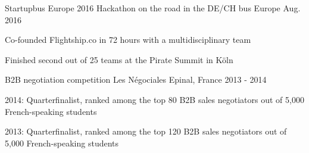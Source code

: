 

\begin{cventries}

  \cventry
    {Startupbus Europe 2016} %
    {Hackathon on the road in the DE/CH bus} %
    {Europe} %
    {Aug. 2016} %
    {
      \begin{cvitems} %
        \item {Co-founded Flightship.co in 72 hours with a multidisciplinary team}
        \item {Finished second out of 25 teams at the Pirate Summit in Köln}
      \end{cvitems}
    }

  \cventry
    {B2B negotiation competition} %
    {Les Négociales} %
    {Epinal, France} %
    {2013 - 2014} %
    {
    	\begin{cvitems}
    	\item{2014: Quarterfinalist, ranked among the top 80 B2B sales negotiators out of 5,000 French-speaking students}
    	\item{2013: Quarterfinalist, ranked among the top 120 B2B sales negotiators out of 5,000 French-speaking students}
    	\end{cvitems}
    }
\end{cventries}
